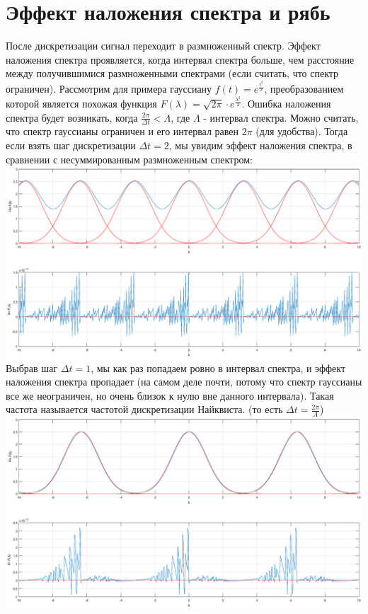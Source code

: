 \documentclass[11pt]{article}
\begin{document}
\section{Эффект наложения спектра и рябь}
После дискретизации сигнал переходит в размноженный спектр. Эффект наложения спектра проявляется, когда интервал спектра больше, чем расстояние между получившимися размноженными спектрами (если считать, что спектр ограничен). Рассмотрим для примера гауссиану $f(t) = e^\frac{t^2}{2}$, преобразованием которой является похожая функция $F(\lambda) = \sqrt{2 \pi} \cdot e^\frac{\lambda^2}{2}$. Ошибка наложения спектра будет возникать, когда $\frac{2 \pi}{\Delta t} < \Lambda$, где $\Lambda$ - интервал спектра. Можно считать, что спектр гауссианы ограничен и его интервал равен $2 \pi$ (для удобства). Тогда если взять шаг дискретизации $\Delta t = 2$, мы увидим эффект наложения спектра, в сравнении с несуммированным размноженным спектром:
\includegraphics[width=1\textwidth]{aliasing1.eps}
Выбрав шаг $\Delta t = 1$, мы как раз попадаем ровно в интервал спектра, и эффект наложения спектра пропадает (на самом деле почти, потому что спектр гауссианы все же неограничен, но очень близок к нулю вне данного интервала). Такая частота называется частотой дискретизации Найквиста. (то есть $\Delta t  = \frac{2 \pi}{\Lambda}$)
\newline
\includegraphics[width=1\textwidth]{aliasing2.eps}
\end{document}
